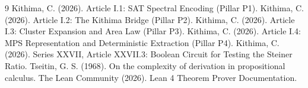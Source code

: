 \documentclass[11pt,a4paper]{article}
\begin{document}

\begin{thebibliography}{9}
  Kithima, C. (2026). Article I.1: SAT Spectral Encoding (Pillar P1).
  Kithima, C. (2026). Article I.2: The Kithima Bridge (Pillar P2).
  Kithima, C. (2026). Article I.3: Cluster Expansion and Area Law (Pillar P3).
  Kithima, C. (2026). Article I.4: MPS Representation and Deterministic Extraction (Pillar P4).
  Kithima, C. (2026). Series XXVII, Article XXVII.3: Boolean Circuit for Testing the Steiner Ratio.
  Tseitin, G. S. (1968). On the complexity of derivation in propositional calculus.
  The Lean Community (2026). Lean 4 Theorem Prover Documentation.
\end{thebibliography}
\end{document}
